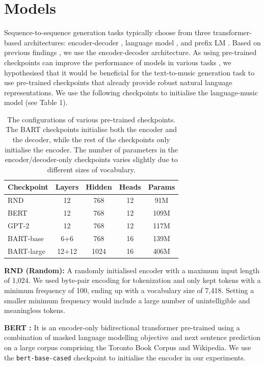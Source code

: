 \documentclass[letterpaper]{article} %
\begin{document}
\section{Models}
Sequence-to-sequence generation tasks typically choose from three transformer-based architectures: encoder-decoder \cite{DBLP:conf/nips/VaswaniSPUJGKP17}, language model \cite{radford2018improving}, and prefix LM \cite{DBLP:conf/iclr/LiuSPGSKS18}. Based on previous findings \cite{DBLP:journals/jmlr/RaffelSRLNMZLL20}, we use the encoder-decoder architecture. As using pre-trained checkpoints can improve the performance of models in various tasks \cite{DBLP:journals/tacl/RotheNS20}, we hypothesised that it would be beneficial for the text-to-music generation task to use pre-trained checkpoints that already provide robust natural language representations. We use the following checkpoints to initialise the language-music model (see Table 1).

\begin{table}[t!]
\begin{center}
\caption{The configurations of various pre-trained checkpoints. The BART checkpoints initialise both the encoder and the decoder, while the rest of the checkpoints only initialise the encoder. The number of parameters in the encoder/decoder-only checkpoints varies slightly due to different sizes of vocabulary.}
\begin{tabular}{l|c|c|c|c}
\toprule %
Checkpoint & Layers & Hidden & Heads & Params\\
\midrule %
RND & 12 & 768 & 12 & 91M\\
BERT & 12 & 768 & 12 & 109M\\
GPT-2 & 12 & 768 & 12 & 117M\\
BART-base & 6+6 & 768 & 16 & 139M\\
BART-large & 12+12 & 1024 & 16 & 406M\\
\bottomrule %
\end{tabular}
\end{center}
\end{table}

\noindent
\textbf{RND (Random):} A randomly initialised encoder with a maximum input length of 1,024. We used byte-pair encoding for tokenization and only kept tokens with a minimum frequency of 100, ending up with a vocabulary size of 7,418. Setting a smaller minimum frequency would include a large number of unintelligible and meaningless tokens.

\noindent
\textbf{BERT \cite{DBLP:conf/naacl/DevlinCLT19}:} It is an encoder-only bidirectional transformer pre-trained using a combination of masked language modelling objective and next sentence prediction on a large corpus comprising the Toronto Book Corpus and Wikipedia. We use the \texttt{bert-base-cased} checkpoint to initialise the encoder in our experiments.
\end{document}
